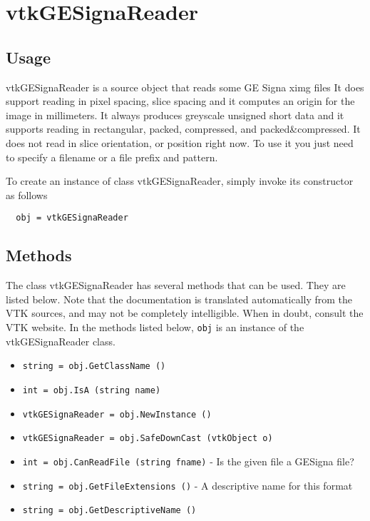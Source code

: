 \section{vtkGESignaReader}

\subsection{Usage}

 vtkGESignaReader is a source object that reads some GE Signa ximg files It
 does support reading in pixel spacing, slice spacing and it computes an
 origin for the image in millimeters. It always produces greyscale unsigned
 short data and it supports reading in rectangular, packed, compressed, and
 packed\&compressed. It does not read in slice orientation, or position
 right now. To use it you just need to specify a filename or a file prefix
 and pattern.

To create an instance of class vtkGESignaReader, simply
invoke its constructor as follows
\begin{verbatim}
  obj = vtkGESignaReader
\end{verbatim}
\subsection{Methods}

The class vtkGESignaReader has several methods that can be used.
  They are listed below.
Note that the documentation is translated automatically from the VTK sources,
and may not be completely intelligible.  When in doubt, consult the VTK website.
In the methods listed below, \verb|obj| is an instance of the vtkGESignaReader class.
\begin{itemize}
\item  \verb|string = obj.GetClassName ()|

\item  \verb|int = obj.IsA (string name)|

\item  \verb|vtkGESignaReader = obj.NewInstance ()|

\item  \verb|vtkGESignaReader = obj.SafeDownCast (vtkObject o)|

\item  \verb|int = obj.CanReadFile (string fname)| -  Is the given file a GESigna file?

\item  \verb|string = obj.GetFileExtensions ()| -  A descriptive name for this format

\item  \verb|string = obj.GetDescriptiveName ()|

\end{itemize}
